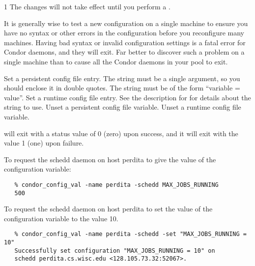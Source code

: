 \begin{ManPage}{\label{man-condor-config-val}}{1}
\Note The changes will not take effect until you perform a
.

\Note It is generally wise to test a new configuration on a single
machine to ensure you have no syntax or other errors in the
configuration before you reconfigure many machines.  
Having bad syntax or invalid configuration settings is a fatal error
for Condor daemons, and they will exit.
Far better to discover such a problem on a single machine than to
cause all the Condor daemons in your pool to exit.

\begin{Options}
	 { Set a persistent
	config file entry.
	The string must be a single argument, so you should enclose it
	in double quotes.
	The string must be of the form ``variable = value''. }
	 { Set a runtime
	config file entry.
	See the description for  for details about the
	string to use. } 
	 { Unset a persistent
	config file variable. }
	 { Unset a runtime
	config file variable. }
\end{Options}

\ExitStatus

 will exit with a status value of 0 (zero) upon success,
and it will exit with the value 1 (one) upon failure.

\Examples

To request the schedd daemon on host perdita
to give the value of the
configuration variable:
\begin{verbatim}
   % condor_config_val -name perdita -schedd MAX_JOBS_RUNNING
   500
\end{verbatim}

To request the schedd daemon on host perdita
to set the value of the 
configuration variable
to the value 10.
\begin{verbatim}
   % condor_config_val -name perdita -schedd -set "MAX_JOBS_RUNNING = 10"
   Successfully set configuration "MAX_JOBS_RUNNING = 10" on 
   schedd perdita.cs.wisc.edu <128.105.73.32:52067>.
\end{verbatim}


\end{ManPage}
